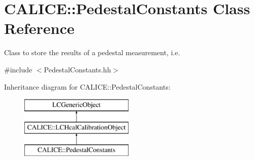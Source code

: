 \section{C\-A\-L\-I\-C\-E\-:\-:Pedestal\-Constants Class Reference}
\label{classCALICE_1_1PedestalConstants}


Class to store the results of a pedestal measurement, i.\-e.  




{\ttfamily \#include $<$Pedestal\-Constants.\-hh$>$}

Inheritance diagram for C\-A\-L\-I\-C\-E\-:\-:Pedestal\-Constants\-:\begin{figure}[H]
\begin{center}
\leavevmode
\includegraphics[height=3.000000cm]{classCALICE_1_1PedestalConstants}
\end{center}
\end{figure}
